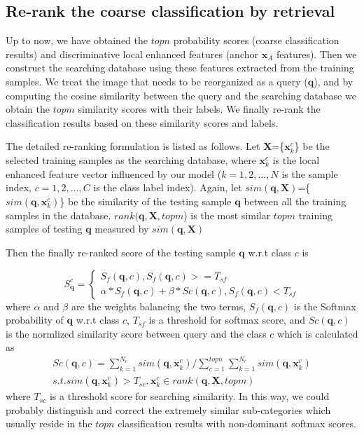 \documentclass[10pt,twocolumn,letterpaper]{article}
\begin{document}
\subsection{Re-rank the coarse classification by retrieval}

Up to now, we have obtained the $topn$ probability scores (coarse classification results) and discriminative local enhanced features (anchor $\bm{x}_A$ features). Then we construct the searching database using these features extracted from the training samples. We treat the image that needs to be reorganized as a query ($\bm{q}$), and by computing the cosine similarity between the query and the searching database we obtain the $topm$ similarity scores with their labels. We finally re-rank the classification results based on these similarity scores and labels. 

The detailed re-ranking formulation is listed as follows.
Let $\bm{X}$=\{$\bm{x}_k^{c}$\} be the selected training samples as the searching database, where $\bm{x}_k^{c}$ is the local enhanced feature vector influenced by our model ($k=1,2,...,N$ is the sample index, $c=1,2,...,C$ is the class label index).
Again, let $sim(\bm{q},\bm{X})$=\{$sim(\bm{q},\bm{x}_k^{c})$\} be the similarity of the testing sample $\bm{q}$ between all the training samples in the database. $rank(\bm{q},\bm{X}, topm$) is the most similar $topm$ training samples of testing $\bm{q}$ measured by $sim(\bm{q},\bm{X})$

Then the finally re-ranked score of the testing sample $\bm{q}$ w.r.t class ${c}$ is


\begin{equation}
{S_{\bm{q}}^c =
\left\{
\begin{array}{rl}
S_f(\bm{q},c),  {S_f(\bm{q},c)  >= T_{sf}} \\
\alpha*S_f(\bm{q},c)+\beta*Sc(\bm{q},c),{S_f(\bm{q},c) < T_{sf}}\label{con:eq8}
\end{array}
\right.}
\end{equation}
where $\alpha$ and $\beta$ are the weights balancing the two terms, $S_f(\bm{q},c)$ is the Softmax probability of $\bm{q}$ w.r.t class $c$, $T_{sf}$ is a threshold for softmax score, and $Sc(\bm{q},c)$ is the normlized similarity score between query and the class $c$ which is calculated as 
\begin{equation}
\begin{aligned}
{Sc(\bm{q},c)}=\sum_{k=1}^{N_c}sim(\bm{q},\bm{x}_k^c)/\sum_{c=1}^{topn}\sum_{k=1}^{N_c}sim(\bm{q},\bm{x}_k^c) \\
s.t. sim(\bm{q},\bm{x}_k^{c})>T_{sc}, \bm{x}_k^{c} \in rank(\bm{q},\bm{X},{topm})
\end{aligned}
\end{equation}
where $T_{sc}$ is a threshold score for searching similarity.
In this way, we could probably distinguish and correct the extremely similar sub-categories which usually reside in the $topn$ classification results with non-dominant softmax scores.
\end{document}
